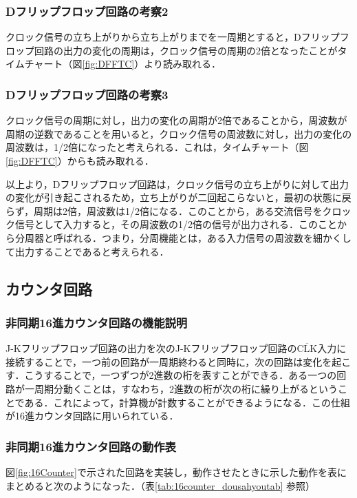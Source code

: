%
%
\subsubsection{Dフリップフロップ回路の考察2}
\label{DFF_consideration2}
クロック信号の立ち上がりから立ち上がりまでを一周期とすると，Dフリップフロップ回路の出力の変化の周期は，クロック信号の周期の2倍となったことがタイムチャート（図\ref{fig:DFFTC}）より読み取れる．
%
%
\subsubsection{Dフリップフロップ回路の考察3}
\label{DFF_consideration3}
クロック信号の周期に対し，出力の変化の周期が2倍であることから，周波数が周期の逆数であることを用いると，クロック信号の周波数に対し，出力の変化の周波数は，1/2倍になったと考えられる．これは，タイムチャート（図\ref{fig:DFFTC}）からも読み取れる．
\\
\par
以上より，Dフリップフロップ回路は，クロック信号の立ち上がりに対して出力の変化が引き起こされるため，立ち上がりが二回起こらないと，最初の状態に戻らず，周期は2倍，周波数は1/2倍になる．このことから，ある交流信号をクロック信号として入力すると，その周波数の1/2倍の信号が出力される．このことから分周器と呼ばれる．つまり，分周機能とは，ある入力信号の周波数を細かくして出力することであると考えられる．

%
%
\subsection{カウンタ回路}
\label{experiment_counter}

%
%
\subsubsection{非同期16進カウンタ回路の機能説明}
\label{16counter_explain}
J-Kフリップフロップ回路の出力を次のJ-Kフリップフロップ回路の$\overline{\mathrm{CLK}}$入力に接続することで，一つ前の回路が一周期終わると同時に，次の回路は変化を起こす．こうすることで，一つずつが2進数の桁を表すことができる．ある一つの回路が一周期分動くことは，すなわち，2進数の桁が次の桁に繰り上がるということである．これによって，計算機が計数することができるようになる．この仕組が16進カウンタ回路に用いられている．

%
%
\subsubsection{非同期16進カウンタ回路の動作表}
\label{16counter_dousahyou}
図\ref{fig:16Counter}で示された回路を実装し，動作させたときに示した動作を表にまとめると次のようになった．（表\ref{tab:16counter_dousahyoutab} 参照）

